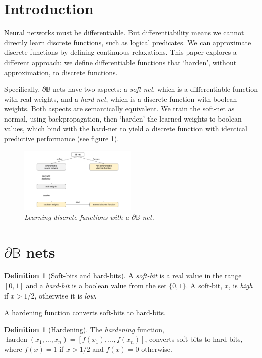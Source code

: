 \documentclass{article}
\theoremstyle{plain}
\theoremstyle{definition}
\newtheorem{definition}[theorem]{Definition}
\theoremstyle{remark}
\begin{document}
\vspace{-0.96cm}

\section{Introduction}

Neural networks must be differentiable. But differentiability means we cannot directly learn discrete functions, such as logical predicates. We can approximate discrete functions by defining continuous relaxations. This paper explores a different approach: we define differentiable functions that `harden', without approximation, to discrete functions. 

Specifically, $\partial \mathbb{B}$ nets have two aspects: a {\em soft-net}, which is a differentiable function with real weights, and a {\em hard-net}, which is a discrete function with boolean weights. Both aspects are semantically equivalent. We train the soft-net as normal, using backpropagation, then `harden' the learned weights to boolean values, which bind with the hard-net to yield a discrete function with identical predictive performance (see figure \ref{fig:main-idea}).

\begin{figure}[h]
	\centering
	\includegraphics[trim=80pt 25pt 40pt 10pt, clip, width=0.5\textwidth]{../db-net.png}
	\caption{{\em Learning discrete functions with a $\partial\mathbb{B}$ net.}}
	\label{fig:main-idea}
\end{figure}

\section{$\partial\mathbb{B}$ nets}\label{sec:db-nets}

\begin{definition}[Soft-bits and hard-bits]
	A {\em soft-bit} is a real value in the range $[0,1]$ and a {\em hard-bit} is a boolean value from the set $\{0,1\}$. A soft-bit, $x$, is {\em high} if $x>1/2$, otherwise it is {\em low}.
\end{definition}
A hardening function converts soft-bits to hard-bits.
\begin{definition}[Hardening]
	The {\em hardening} function, $\operatorname{harden}(x_{1}, \dots, x_{n}) = [f(x_{1}), \dots, f(x_{n})]$, converts soft-bits to hard-bits, where $f(x)=1$ if $x > 1/2$ and $f(x)=0$ otherwise.
\end{definition}
\end{document}
